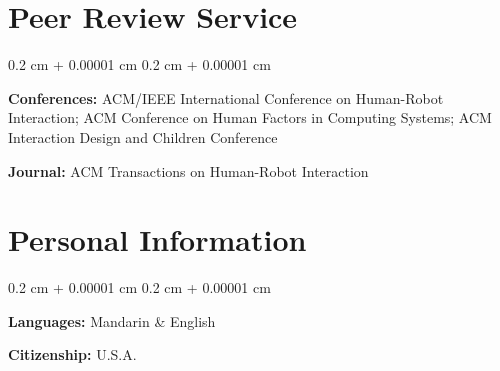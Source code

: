 \documentclass[10pt, letterpaper]{article}
\newenvironment{onecolentry}{
    \begin{adjustwidth}{
        0.2 cm + 0.00001 cm
    }{
        0.2 cm + 0.00001 cm
    }
}{
    \end{adjustwidth}
} %
\begin{document}
      

    \section{Peer Review Service}
        \begin{onecolentry}
            \textbf{Conferences:} ACM/IEEE International Conference on Human-Robot Interaction; ACM Conference on Human Factors in Computing Systems; ACM Interaction Design and Children Conference

            \vspace{0.1 cm}

            \textbf{Journal:} ACM Transactions on Human-Robot Interaction
        \end{onecolentry}


    
    \section{Personal Information}

        \begin{onecolentry}
            \textbf{Languages:} Mandarin \& English
            
            \vspace{0.1 cm}
            
            \textbf{Citizenship:} U.S.A.
        \end{onecolentry}




    
\end{document}
